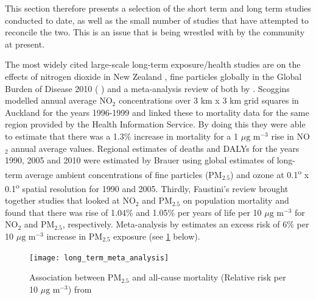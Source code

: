 
This section therefore presents a selection of the short term and long term studies conducted to date, as well as the small number of studies that have attempted to reconcile the two. This is an issue that is being wrestled with by the community at present.

The most widely cited large-scale long-term exposure/health studies are on the effects of nitrogen dioxide in New Zealand \cite{Scoggins2004}, fine particles globally in the Global Burden of Disease 2010 ( \cite{Brauer2012}) and a meta-analysis review of both by \cite{Faustini2014}. 
Scoggins modelled annual average NO$_{2}$ concentrations over 3 km x 3 km grid squares in Auckland for the years 1996-1999 and linked these to mortality data for the same region provided by the Health Information Service. By doing this they were able to estimate that there was a 1.3\% increase in mortality for a 1 $\mu \text{g m}^{-3}$ rise in NO$_{2}$ annual average values.
Regional estimates of deaths and DALYs for the years 1990, 2005 and 2010 were estimated by Brauer using global estimates of long-term average ambient concentrations of fine particles (PM$_{2.5}$) and ozone at 0.1\textsuperscript{o} x 0.1\textsuperscript{o} spatial resolution for 1990 and 2005.
Thirdly, Faustini's review brought together studies that looked at NO$_{2}$ and PM$_{2.5}$ on population mortality and found that there was rise of 1.04\% and 1.05\% per years of life per 10 $\mu \text{g m}^{-3}$ for NO$_{2}$ and PM$_{2.5}$, respectively. Meta-analysis by \cite{Hoek2013} estimates an excess risk of 6\% per 10 $\mu \text{g m}^{-3}$ increase in PM$_{2.5}$ exposure (see \ref{fig:long_term_meta_analysis} below).

\begin{figure}[H]
\centering
\texttt{[image: long\_term\_meta\_analysis]}
\caption{Association between PM$_{2.5}$ and all-cause mortality (Relative risk per 10 $\mu \text{g m}^{-3}$) from \cite{Hoek2013}}
\label{fig:long_term_meta_analysis}
\end{figure}

